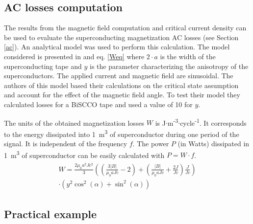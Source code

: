 \documentclass{ws-jmrr}
\begin{document}
\begin{multicols}{2}
\subsection{AC losses computation}
\label{aclosses}
The results from the magnetic field computation and critical current density can be used to evaluate the superconducting magnetization AC losses (see Section \ref{ac}). 
 An analytical model was used to perform this calculation. 
  The model considered is presented in \cite{zhang2003angular} and eq. \ref{Weq} where $2\cdot a$ is the width of the superconducting tape and $y$ is the parameter characterizing the anisotropy of the superconductors. The applied current and magnetic field are sinusoidal. The authors of this model based their calculations on the critical state assumption \cite{bean1962magnetization} and account for the effect of the magnetic field angle. To test their model they calculated losses for a BiSCCO tape and used a value of 10 for $y$. \par
The units of the obtained magnetization losses $W$ is J$\cdot$m\textsuperscript{-3}$\cdot$cycle\textsuperscript{-1}. It corresponds to the energy dissipated into 1~m\textsuperscript{3} of superconductor during one period of the signal. It is independent of the frequency $f$. The power $P$ (in Watts) dissipated in 1~m\textsuperscript{3} of superconductor can be easily calculated with $P=W\cdot f$. 
\begin{align}
\begin{split}
W=\frac{2\mu_0a^2Jc^2}{3}\left( \left(\frac{3\left|B  \right|}{\mu_0aJc}-2  \right)+\left(\frac{\left|B  \right|}{\mu_0aJc}+\frac{2J}{Jc}  \right)\frac{J}{Jc}\right) \\ \cdot \left( y^2\cos^2(\alpha )+\sin^2(\alpha ) \right)
\label{Weq}
\end{split}
\end{align}
   

\subsection{Practical example}


\end{multicols}
\end{document}
